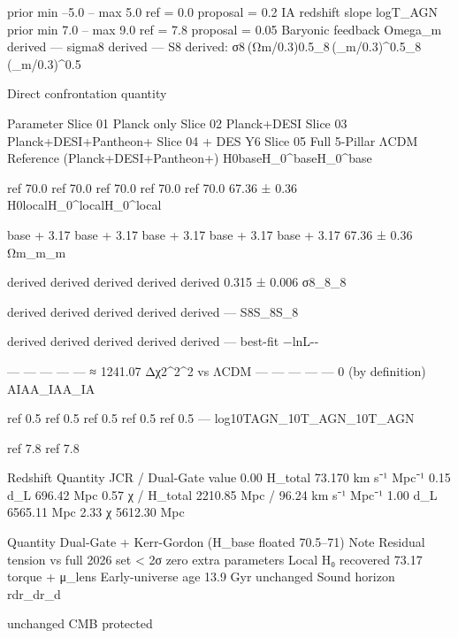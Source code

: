 prior min –5.0 – max 5.0
ref = 0.0
proposal = 0.2
IA redshift slope
logT_AGN
prior min 7.0 – max 9.0
ref = 7.8
proposal = 0.05
Baryonic feedback
Omega_m
derived
—
sigma8
derived
—
S8
derived: σ8 (Ωm/0.3)0.5\sigma_8\,(\Omega_m/0.3)^{0.5}\sigma_8\,(\Omega_m/0.3)^{0.5}

Direct confrontation quantity

Parameter
Slice 01
Planck only
Slice 02
Planck+DESI
Slice 03
Planck+DESI+Pantheon+
Slice 04
+ DES Y6
Slice 05
Full 5-Pillar
ΛCDM Reference
(Planck+DESI+Pantheon+)
H0baseH_0^{\rm base}H_0^{\rm base}

ref 70.0
ref 70.0
ref 70.0
ref 70.0
ref 70.0
67.36 ± 0.36
H0localH_0^{\rm local}H_0^{\rm local}

base + 3.17
base + 3.17
base + 3.17
base + 3.17
base + 3.17
67.36 ± 0.36
Ωm\Omega_m\Omega_m

derived
derived
derived
derived
derived
0.315 ± 0.006
σ8\sigma_8\sigma_8

derived
derived
derived
derived
derived
—
S8S_8S_8

derived
derived
derived
derived
derived
—
best-fit −ln⁡L-\ln{}-\ln{}

—
—
—
—
—
≈ 1241.07
Δχ2\Delta\chi^2\Delta\chi^2
 vs ΛCDM
—
—
—
—
—
0 (by definition)
AIAA_{\rm IA}A_{\rm IA}

ref 0.5
ref 0.5
ref 0.5
ref 0.5
ref 0.5
—
log⁡10TAGN\log_{10}T_{\rm AGN}\log_{10}T_{\rm AGN}

ref 7.8
ref 7.8

Redshift
Quantity
JCR / Dual-Gate value
0.00
H_total
73.170 km s⁻¹ Mpc⁻¹
0.15
d_L
696.42 Mpc
0.57
χ / H_total
2210.85 Mpc / 96.24 km s⁻¹ Mpc⁻¹
1.00
d_L
6565.11 Mpc
2.33
χ
5612.30 Mpc

Quantity
Dual-Gate + Kerr-Gordon (H_base floated 70.5–71)
Note
Residual tension vs full 2026 set
< 2σ
zero extra parameters
Local H₀ recovered
73.17
torque + μ_lens
Early-universe age
13.9 Gyr
unchanged
Sound horizon rdr_dr_d

unchanged
CMB protected
